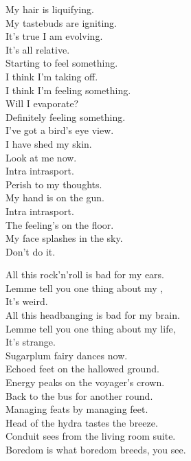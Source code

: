 My hair is liquifying. \\
My tastebuds are igniting. \\
It's true I am evolving. \\
It's all relative. \\

Starting to feel something. \\
I think I'm taking off. \\
I think I'm feeling something. \\
Will I evaporate? \\
Definitely feeling something. \\
I've got a bird's eye view. \\
I have shed my skin. \\
Look at me now. \\

Intra intrasport. \\
Perish to my thoughts. \\
My hand is on the gun. \\
Intra intrasport. \\
The feeling's on the floor. \\
My face splashes in the sky. \\

Don't do it. \\





All this rock'n'roll is bad for my ears. \\
Lemme tell you one thing about my , \\
It's weird. \\
All this headbanging is bad for my brain. \\
Lemme tell you one thing about my life, \\
It's strange. \\

Sugarplum fairy dances now. \\
Echoed feet on the hallowed ground. \\
Energy peaks on the voyager's crown. \\
Back to the bus for another round. \\
Managing feats by managing feet. \\
Head of the hydra tastes the breeze. \\
Conduit sees from the living room suite. \\
Boredom is what boredom breeds, you see. \\


